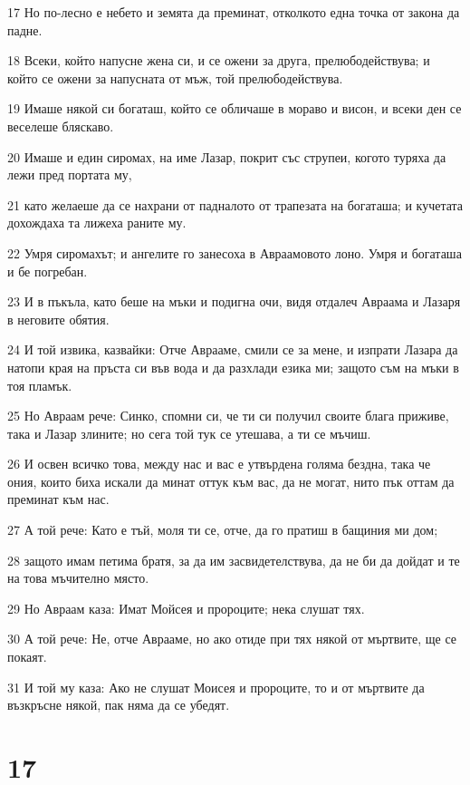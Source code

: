 \par 17 Но по-лесно е небето и земята да преминат, отколкото една точка от закона да падне.
\par 18 Всеки, който напусне жена си, и се ожени за друга, прелюбодействува; и който се ожени за напусната от мъж, той прелюбодействува.
\par 19 Имаше някой си богаташ, който се обличаше в мораво и висон, и всеки ден се веселеше бляскаво.
\par 20 Имаше и един сиромах, на име Лазар, покрит със струпеи, когото туряха да лежи пред портата му,
\par 21 като желаеше да се нахрани от падналото от трапезата на богаташа; и кучетата дохождаха та лижеха раните му.
\par 22 Умря сиромахът; и ангелите го занесоха в Авраамовото лоно. Умря и богаташа и бе погребан.
\par 23 И в пъкъла, като беше на мъки и подигна очи, видя отдалеч Авраама и Лазаря в неговите обятия.
\par 24 И той извика, казвайки: Отче Аврааме, смили се за мене, и изпрати Лазара да натопи края на пръста си във вода и да разхлади езика ми; защото съм на мъки в тоя пламък.
\par 25 Но Авраам рече: Синко, спомни си, че ти си получил своите блага приживе, така и Лазар злините; но сега той тук се утешава, а ти се мъчиш.
\par 26 И освен всичко това, между нас и вас е утвърдена голяма бездна, така че ония, които биха искали да минат оттук към вас, да не могат, нито пък оттам да преминат към нас.
\par 27 А той рече: Като е тъй, моля ти се, отче, да го пратиш в бащиния ми дом;
\par 28 защото имам петима братя, за да им засвидетелствува, да не би да дойдат и те на това мъчително място.
\par 29 Но Авраам каза: Имат Мойсея и пророците; нека слушат тях.
\par 30 А той рече: Не, отче Аврааме, но ако отиде при тях някой от мъртвите, ще се покаят.
\par 31 И той му каза: Ако не слушат Моисея и пророците, то и от мъртвите да възкръсне някой, пак няма да се убедят.

\chapter{17}

